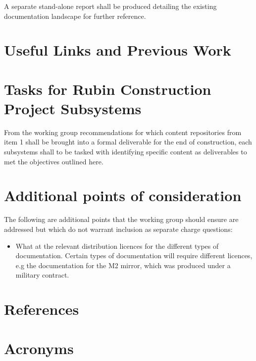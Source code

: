 \documentclass[SE,authoryear,toc]{lsstdoc}
\begin{document}
A separate stand-alone report shall be produced detailing the existing documentation landscape for further reference.

\section{Useful Links and Previous Work}


\section{Tasks for Rubin Construction Project Subsystems}
From the working group recommendations for which content repositories from item 1 shall be brought into a formal deliverable for the end of construction, each subsystems shall to be tasked with identifying specific content as deliverables to met the objectives outlined here.

\appendix
\section{Additional points of consideration}
The following are additional points that the working group should ensure are addressed but which do not warrant inclusion as separate charge questions:

\begin{itemize}
\item What at the relevant distribution licences for the different types of documentation. Certain types of documentation will require different licences, e.g the documentation for the M2 mirror, which was produced under a military contract. 
\end{itemize}

\section{References} 
\label{sec:bib}


\section{Acronyms} \label{sec:acronyms}

\printglossaries
\end{document}
